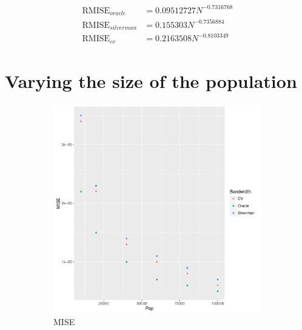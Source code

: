 \begin{align}
    \mbox{RMISE}_{oracle} &= 0.09512727 N^{-0.7316768} \\
    \mbox{RMISE}_{silverman} &= 0.155303 N^{-0.7356884} \\
    \mbox{RMISE}_{cv} &= 0.2163508 N^{-0.8103349}
\end{align}



\section{Varying the size of the population}
\label{sec:results:unifNpop_1h}

\begin{figure}[htbp]
    \centering
    \begin{subfigure}[b]{0.3\textwidth}
    \includegraphics[width=\textwidth]{results/by_pop_size/MISE-vs-population}
    \caption{MISE}
    \end{subfigure}
    \begin{subfigure}[b]{0.3\textwidth}

\end{subfigure}
\end{figure}
